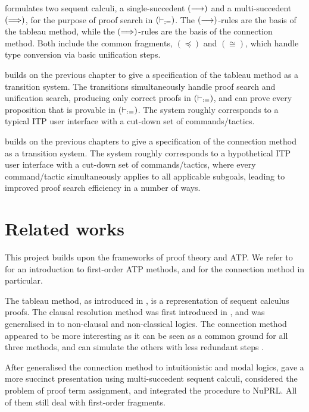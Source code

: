 \documentclass[twoside]{report}
\begin{document}
 formulates two sequent calculi, a single-succedent $(\longrightarrow)$ and a multi-succedent $(\Longrightarrow)$, for the purpose of proof search in $(\vdash_{:=})$. The $(\longrightarrow)$-rules are the basis of the tableau method, while the $(\Longrightarrow)$-rules are the basis of the connection method. Both include the common fragments, $(\preceq)$ and $(\cong)$, which handle type conversion via basic unification steps.

 builds on the previous chapter to give a specification of the tableau method as a transition system. The transitions simultaneously handle proof search and unification search, producing only correct proofs in $(\vdash_{:=})$, and can prove every proposition that is provable in $(\vdash_{:=})$. The system roughly corresponds to a typical ITP user interface with a cut-down set of commands/tactics.

 builds on the previous chapters to give a specification of the connection method as a transition system. The system roughly corresponds to a hypothetical ITP user interface with a cut-down set of commands/tactics, where every command/tactic simultaneously applies to all applicable subgoals, leading to improved proof search efficiency in a number of ways.

\section{Related works}
\label{sec:related_works}

This project builds upon the frameworks of proof theory and ATP. We refer to \cite{harrison2009handbook,pfenning2004automated} for an introduction to first-order ATP methods, and \cite{bibel1983matings,waaler2001connections} for the connection method in particular.

The tableau method, as introduced in \cite{smullyan1968first,fitting1972tableau}, is a representation of sequent calculus proofs. The clausal resolution method was first introduced in \cite{robinson1965machine}, and was generalised in \cite{mints1988gentzen,tammet1997resolution} to non-clausal and non-classical logics. The connection method \cite{prawitz1968proof,andrews1981theorem,bibel1981matrices} appeared to be more interesting as it can be seen as a common ground for all three methods, and can simulate the others with less redundant steps \cite{bibel1982comparative}.

After \cite{wallen1987automated} generalised the connection method to intuitionistic and modal logics, \cite{waaler2001connections} gave a more succinct presentation using multi-succedent sequent calculi, \cite{schmitt1995transforming,schmitt1996converting} considered the problem of proof term assignment, and \cite{kreitz2000matrix} integrated the procedure to NuPRL. All of them still deal with first-order fragments.
\end{document}
